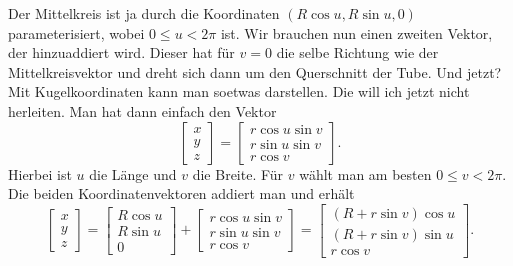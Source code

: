 \documentclass[a4paper,12pt,fleqn]{article}
\begin{document}
Der Mittelkreis ist ja durch die Koordinaten \((R\cos u,R\sin u,0)\)
parameterisiert, wobei \(0\le u<2\pi\) ist. Wir brauchen nun
einen zweiten Vektor, der hinzuaddiert wird. Dieser hat für \(v=0\)
die selbe Richtung wie der Mittelkreisvektor und dreht sich dann um
den Querschnitt der Tube. Und jetzt? Mit Kugelkoordinaten kann man
soetwas darstellen. Die will ich jetzt nicht herleiten. Man hat
dann einfach den Vektor
\begin{equation}
\begin{bmatrix}
x\\ y\\ z
\end{bmatrix}
= \begin{bmatrix}
r\cos u\sin v\\
r\sin u\sin v\\
r\cos v
\end{bmatrix}.
\end{equation}
Hierbei ist \(u\) die Länge und \(v\) die Breite. Für \(v\) wählt man
am besten \(0\le v<2\pi\). Die beiden Koordinatenvektoren addiert man
und erhält
\begin{equation}\label{Torus}
\begin{bmatrix}
x\\ y\\ z
\end{bmatrix}
= \begin{bmatrix}
R\cos u\\
R\sin u\\
0
\end{bmatrix}+\begin{bmatrix}
r\cos u\sin v\\
r\sin u\sin v\\
r\cos v
\end{bmatrix}
= \begin{bmatrix}
(R+r\sin v)\cos u\\
(R+r\sin v)\sin u\\
r\cos v
\end{bmatrix}.
\end{equation}
\end{document}
